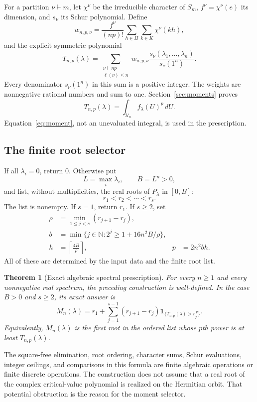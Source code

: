 \documentclass[11pt]{article}
\newcommand{\U}{\mathcal U}
\newcommand{\N}{\mathbb N}
\newcommand{\one}{\mathbf 1}
\newtheorem{theorem}{Theorem}[section]
\theoremstyle{definition}\newtheorem{definition}[theorem]{Definition}
\theoremstyle{remark}\newtheorem{remark}[theorem]{Remark}
\begin{document}
For a partition $\nu\vdash m$, let $\chi^\nu$ be the irreducible character of $S_m$, $f^\nu=\chi^\nu(e)$ its dimension, and $s_\nu$ its Schur polynomial. Define
\begin{equation}\label{eq:weights}
 w_{n,p,\nu}=\frac{f^\nu}{(np)!}
       \sum_{h\in H}\sum_{k\in K}\chi^\nu(kh),
\end{equation}
and the explicit symmetric polynomial
\begin{equation}\label{eq:moment}
 T_{n,p}(\lambda)=
 \sum_{\substack{\nu\vdash np\\\ell(\nu)\leq n}}
 w_{n,p,\nu}\frac{s_\nu(\lambda_1,\ldots,\lambda_n)}{s_\nu(1^n)}.
\end{equation}
Every denominator $s_\nu(1^n)$ in this sum is a positive integer. The weights are nonnegative rational numbers and sum to one. Section~\ref{sec:moments} proves
\begin{equation}\label{eq:moment_integral}
 T_{n,p}(\lambda)=\int_{\U_n}f_\lambda(U)^p\,dU.
\end{equation}
Equation~\eqref{eq:moment}, not an unevaluated integral, is used in the prescription.

\subsection{The finite root selector}
If all $\lambda_i=0$, return $0$. Otherwise put
\[
 L=\max_i\lambda_i,\qquad B=L^n>0,
\]
and list, without multiplicities, the real roots of $P_\lambda$ in $[0,B]$:
\[
 r_1<r_2<\cdots<r_s.
\]
The list is nonempty. If $s=1$, return $r_1$. If $s\geq2$, set
\begin{align}
 \rho&=\min_{1\leq j<s}(r_{j+1}-r_j),\label{eq:gap}\\
 b&=\min\{j\in\N:2^j\geq1+16n^2B/\rho\},\nonumber\\
 h&=\left\lceil\frac{4B}{\rho}\right\rceil,
 &p&=2n^2bh.\label{eq:order}
\end{align}
All of these are determined by the input data and the finite root list.

\begin{theorem}[Exact algebraic spectral prescription]\label{thm:general}
For every $n\geq1$ and every nonnegative real spectrum, the preceding construction is well-defined. In the case $B>0$ and $s\geq2$, its exact answer is
\begin{equation}\label{eq:main}
\boxed{\displaystyle
 M_n(\lambda)=r_1+\sum_{j=1}^{s-1}(r_{j+1}-r_j)
       \one_{\{T_{n,p}(\lambda)>r_j^{\,p}\}}.}
\end{equation}
Equivalently, $M_n(\lambda)$ is the first root in the ordered list whose $p$th power is at least $T_{n,p}(\lambda)$.
\end{theorem}
The square-free elimination, root ordering, character sums, Schur evaluations, integer ceilings, and comparisons in this formula are finite algebraic operations or finite discrete operations. The construction does not assume that a real root of the complex critical-value polynomial is realized on the Hermitian orbit. That potential obstruction is the reason for the moment selector.
\end{document}
